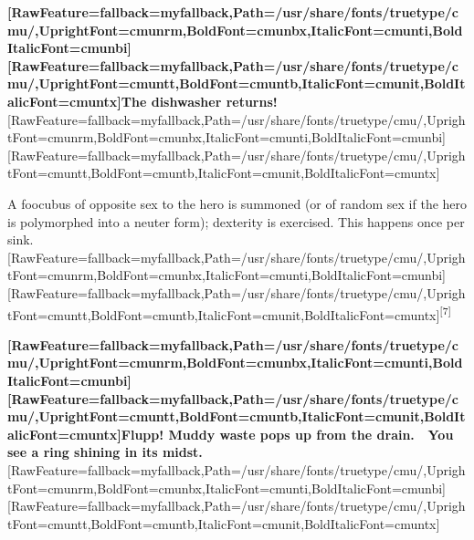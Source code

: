 {\bfseries \allowbreak{}\setmainfont{cmunbx.ttf}[RawFeature={fallback=myfallback},Path=/usr/share/fonts/truetype/cmu/,UprightFont=cmunrm,BoldFont=cmunbx,ItalicFont=cmunti,BoldItalicFont=cmunbi]\setmonofont{cmunbx.ttf}[RawFeature={fallback=myfallback},Path=/usr/share/fonts/truetype/cmu/,UprightFont=cmuntt,BoldFont=cmuntb,ItalicFont=cmunit,BoldItalicFont=cmuntx]\bfseries The dishwasher returns!}\allowbreak{}\setmainfont{cmunrm.ttf}[RawFeature={fallback=myfallback},Path=/usr/share/fonts/truetype/cmu/,UprightFont=cmunrm,BoldFont=cmunbx,ItalicFont=cmunti,BoldItalicFont=cmunbi]\setmonofont{cmunrm.ttf}[RawFeature={fallback=myfallback},Path=/usr/share/fonts/truetype/cmu/,UprightFont=cmuntt,BoldFont=cmuntb,ItalicFont=cmunit,BoldItalicFont=cmuntx]

\begin{myquote}
\item{}A foocubus\footnotemark[58] of opposite sex to the hero is summoned (or of random sex if the hero is polymorphed\footnotemark[59] into a neuter form); dexterity is exercised. This happens once per sink.\allowbreak{}\setmainfont{cmunrm.ttf}[RawFeature={fallback=myfallback},Path=/usr/share/fonts/truetype/cmu/,UprightFont=cmunrm,BoldFont=cmunbx,ItalicFont=cmunti,BoldItalicFont=cmunbi]\setmonofont{cmunrm.ttf}[RawFeature={fallback=myfallback},Path=/usr/share/fonts/truetype/cmu/,UprightFont=cmuntt,BoldFont=cmuntb,ItalicFont=cmunit,BoldItalicFont=cmuntx]\textsuperscript{{$\text{[}$}7{$\text{]}$}}
\end{myquote}

{\bfseries \allowbreak{}\setmainfont{cmunbx.ttf}[RawFeature={fallback=myfallback},Path=/usr/share/fonts/truetype/cmu/,UprightFont=cmunrm,BoldFont=cmunbx,ItalicFont=cmunti,BoldItalicFont=cmunbi]\setmonofont{cmunbx.ttf}[RawFeature={fallback=myfallback},Path=/usr/share/fonts/truetype/cmu/,UprightFont=cmuntt,BoldFont=cmuntb,ItalicFont=cmunit,BoldItalicFont=cmuntx]\bfseries Flupp! Muddy waste pops up from the drain.$\text{ }$\newline{}
You see a ring shining in its midst.}\allowbreak{}\setmainfont{cmunrm.ttf}[RawFeature={fallback=myfallback},Path=/usr/share/fonts/truetype/cmu/,UprightFont=cmunrm,BoldFont=cmunbx,ItalicFont=cmunti,BoldItalicFont=cmunbi]\setmonofont{cmunrm.ttf}[RawFeature={fallback=myfallback},Path=/usr/share/fonts/truetype/cmu/,UprightFont=cmuntt,BoldFont=cmuntb,ItalicFont=cmunit,BoldItalicFont=cmuntx]

